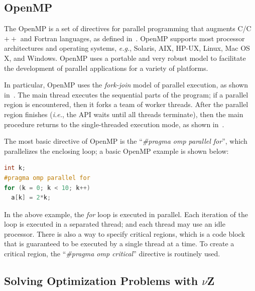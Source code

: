 \documentclass{doublecol-new}
\theoremstyle{TH}{
\newtheorem{lemma}{Lemma}
\newtheorem{theorem}[lemma]{Theorem}
\newtheorem{corrolary}[lemma]{Corrolary}
\newtheorem{conjecture}[lemma]{Conjecture}
\newtheorem{proposition}[lemma]{Proposition}
\newtheorem{claim}[lemma]{Claim}
\newtheorem{stheorem}[lemma]{Wrong Theorem}
\newtheorem{algorithm}{Algorithm}
}
\theoremstyle{THrm}{
\newtheorem{definition}{Definition}[section]
\newtheorem{question}{Question}[section]
\newtheorem{remark}{Remark}
\newtheorem{scheme}{Scheme}
}
\theoremstyle{THhit}{
\newtheorem{case}{Case}[section]
}
\begin{document}
\subsection{OpenMP}
\label{OpenMP}

The OpenMP is a set of directives for parallel programming that augments C/C$++$ and Fortran languages, as defined in~\cite{OpenMP1998}. OpenMP supports most processor architectures and operating systems, {\it e.g.}, Solaris, AIX, HP-UX, Linux, Mac OS X, and Windows. OpenMP uses a portable and very robust model to facilitate the development of parallel applications for a variety of platforms. 

In particular, OpenMP uses the \textit{fork-join} model of parallel execution, as shown in~\cite{OpenMP1998}. The main thread executes the sequential parts of the program; if a parallel region is encountered, then it forks a team of worker threads. After the parallel region finishes ({\it i.e.}, the API waits until all threads terminate), then the main procedure returns to the single-threaded execution mode, as shown in~\cite{Wu2014}.

The most basic directive of OpenMP is the ``\textit{\#pragma omp parallel for}'', which parallelizes the enclosing loop; a basic OpenMP example is shown below:

\begin{lstlisting}[basicstyle=\footnotesize,label={lst:example}, language=C, numberstyle=\tiny, numbersep=7pt,frame=tb,captionpos=t, caption={OpenMP basic Example.}]
int k;
#pragma omp parallel for
for (k = 0; k < 10; k++)
  a[k] = 2*k;
\end{lstlisting}

\vspace{2 mm}
In the above example, the {\it for} loop is executed in parallel. Each iteration of the loop is executed in a separated thread; and each thread may use an idle processor. There is also a way to specify critical regions, which is a code block that is guaranteed to be executed by a single thread at a time. To create a critical region, the ``\textit{\#pragma omp critical}'' directive is routinely used.

\subsection{Solving Optimization Problems with $\nu$Z}
\label{Optimization-with-Vz}
\end{document}
